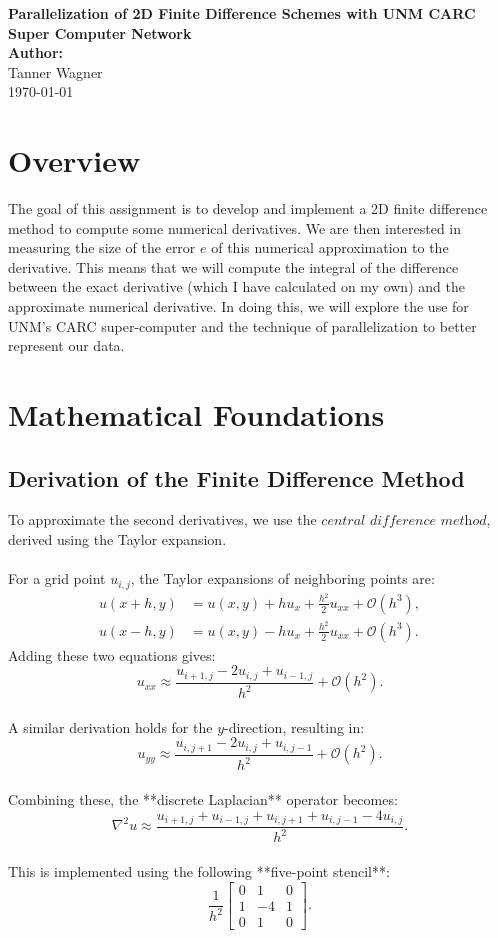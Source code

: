 \documentclass[12pt]{article}
\begin{document}
\begin{titlepage}
  \centering
  \vspace*{1in}
  \huge
  \textbf{Parallelization of 2D Finite Difference Schemes with UNM CARC Super Computer Network}\\[0.5in]
  \Large
  \textbf{Author:}\\[0.2in]
  Tanner Wagner\\[1in]
  \normalsize
  \today
  \vfill
\end{titlepage}

\newpage
\tableofcontents
\newpage


\section{Overview}
The goal of this assignment is to develop and implement a 2D finite difference method to compute some numerical derivatives. We are then interested in measuring the size of the error $e$ of this numerical approximation to the derivative. This means that we will compute the integral of the difference between the exact derivative (which I have calculated on my own) and the approximate numerical derivative. In doing this, we will explore the use for UNM's CARC super-computer and the technique of parallelization to better represent our data.

\section{Mathematical Foundations}
\subsection{Derivation of the Finite Difference Method}
To approximate the second derivatives, we use the $\textit{central difference method}$, derived using the Taylor expansion.
\\
\\
For a grid point \( u_{i,j} \), the Taylor expansions of neighboring points are:
\begin{align*}
    u(x+h, y) &= u(x,y) + h u_x + \frac{h^2}{2} u_{xx} + \mathcal{O}(h^3), \\
    u(x-h, y) &= u(x,y) - h u_x + \frac{h^2}{2} u_{xx} + \mathcal{O}(h^3).
\end{align*}
\noindent Adding these two equations gives:
\[
    u_{xx} \approx \frac{u_{i+1,j} - 2u_{i,j} + u_{i-1,j}}{h^2} + \mathcal{O}(h^2).
\]
\\
\noindent A similar derivation holds for the \( y \)-direction, resulting in:
\[
    u_{yy} \approx \frac{u_{i,j+1} - 2u_{i,j} + u_{i,j-1}}{h^2} + \mathcal{O}(h^2).
\]
\\
\noindent Combining these, the **discrete Laplacian** operator becomes:
\[
    \nabla^2 u \approx \frac{u_{i+1,j} + u_{i-1,j} + u_{i,j+1} + u_{i,j-1} - 4u_{i,j}}{h^2}.
\]
\\
\noindent This is implemented using the following **five-point stencil**:
\[
\frac{1}{h^2}\begin{bmatrix} 0 & 1 & 0 \\ 1 & -4 & 1 \\ 0 & 1 & 0 \end{bmatrix}.
\]
\end{document}
